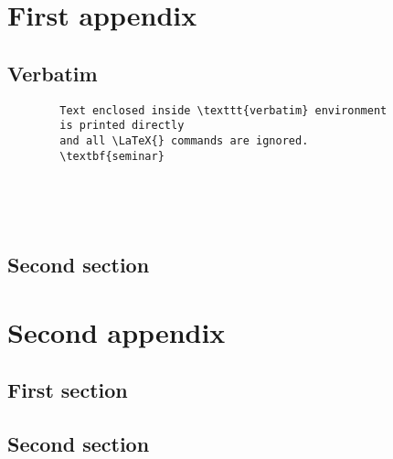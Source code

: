 \begin{appendices}
  \chapter{First appendix}
  \section{Verbatim}
  
 	 \begin{verbatim}
		Text enclosed inside \texttt{verbatim} environment 
		is printed directly 
		and all \LaTeX{} commands are ignored.
		\textbf{seminar}
		
		
		
		
	\end{verbatim} %


  
  \section{Second section}

  \chapter{Second appendix}
  \section{First section}
  \section{Second section}
\end{appendices}
